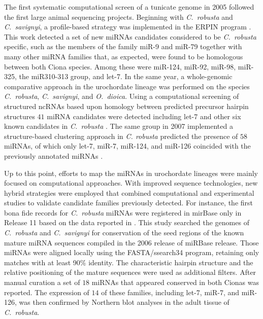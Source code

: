 \documentclass[graybox]{svmult}
\begin{document}
The first systematic computational screen of a tunicate genome in 2005
followed the first large animal sequencing projects. Beginning with
\textit{C.\ robusta} and \textit{C.\ savignyi}, a profile-based strategy
was implemented in the ERPIN program \citep{Legendre2005}. This work
detected a set of new miRNAs candidates considered to be \textit{C.\ robusta}
specific, such as the members of the family miR-9 and miR-79 together with
many other miRNA families that, as expected, were found to be homologous between
both Ciona species. Among these were miR-124, miR-92, miR-98, miR-325, 
the miR310-313 group, and let-7. In the same year, a whole-genomic comparative
approach in the urochordate lineage was performed on the species
\textit{C.\ robusta}, \textit{C.\ savignyi}, and \textit{O.\ dioica}. Using a
computational screening of structured ncRNAs based upon homology between
predicted precursor hairpin structures $41$ miRNA candidates were detected
including let-7 and other six known candidates in \textit{C.\ robusta}
\citep{Missal2005}. The same group in 2007 implemented a
structure-based clustering approach in \textit{C. robusta} predicted the 
presence of $58$ miRNAs, of which only let-7, miR-7, miR-124, and miR-126 
coincided with the previously annotated miRNAs \citep{Will2007}.

Up to this point, efforts to map the miRNAs in urochordate lineages
were mainly focused on computational approaches. With improved sequence
technologies, new hybrid strategies were employed that combined
computational and experimental studies to validate candidate families
previously detected. For instance, the first bona fide records for
\textit{C.\ robusta} miRNAs were registered in mirBase only in Release 11
based on the data reported in \citet{Norden-Krichmar2007}. This study
searched the genomes of \textit{C.\ robusta} and \textit{C.\ savignyi} for
conservation of the seed regions of the known mature miRNA sequences
compiled in the 2006 release of miRBase release. Those miRNAs were aligned
locally using the FASTA/ssearch34 program, retaining only matches with at
least 90\% identity. The characteristic hairpin structure and the relative
positioning of the mature sequences were used as additional filters. After
manual curation a set of $18$ miRNAs that appeared conserved in both Cionas
was reported. The expression of $14$ of these families, including let-7,
miR-7, and miR-126, was then confirmed by Northern blot analyses in the
adult tissue of \textit{C.\ robusta}.
\end{document}
